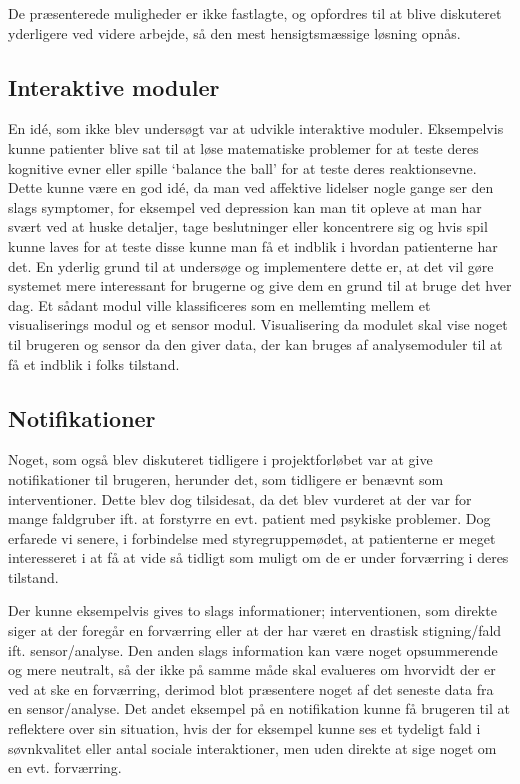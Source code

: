 De præsenterede muligheder er ikke fastlagte, og opfordres til at blive diskuteret yderligere ved videre arbejde, så den mest hensigtsmæssige løsning opnås.

\subsection{Interaktive moduler}
En idé, som ikke blev undersøgt var at udvikle interaktive moduler.
Eksempelvis kunne patienter blive sat til at løse matematiske problemer for at teste deres kognitive evner eller spille `balance the ball' for at teste deres reaktionsevne.
Dette kunne være en god idé, da man ved affektive lidelser nogle gange ser den slags symptomer, for eksempel ved depression kan man tit opleve at man har svært ved at huske detaljer, tage beslutninger eller koncentrere sig og hvis spil kunne laves for at teste disse kunne man få et indblik i hvordan patienterne har det. 
En yderlig grund til at undersøge og implementere dette er, at det vil gøre systemet mere interessant for brugerne og give dem en grund til at bruge det hver dag. 
Et sådant modul ville klassificeres som en mellemting mellem et visualiserings modul og et sensor modul.
Visualisering da modulet skal vise noget til brugeren og sensor da den giver data, der kan bruges af analysemoduler til at få et indblik i folks tilstand.

\subsection{Notifikationer}
Noget, som også blev diskuteret tidligere i projektforløbet var at give notifikationer til brugeren, herunder det, som tidligere er benævnt som interventioner.
Dette blev dog tilsidesat, da det blev vurderet at der var for mange faldgruber ift. at forstyrre en evt. patient med psykiske problemer.
Dog erfarede vi senere, i forbindelse med styregruppemødet, at patienterne er meget interesseret i at få at vide så tidligt som muligt om de er under forværring i deres tilstand.

Der kunne eksempelvis gives to slags informationer; interventionen, som direkte siger at der foregår en forværring eller at der har været en drastisk stigning/fald ift. sensor/analyse.
Den anden slags information kan være noget opsummerende og mere neutralt, så der ikke på samme måde skal evalueres om hvorvidt der er ved at ske en forværring, derimod blot præsentere noget af det seneste data fra en sensor/analyse.
Det andet eksempel på en notifikation kunne få brugeren til at reflektere over sin situation, hvis der for eksempel kunne ses et tydeligt fald i søvnkvalitet eller antal sociale interaktioner, men uden direkte at sige noget om en evt. forværring.

